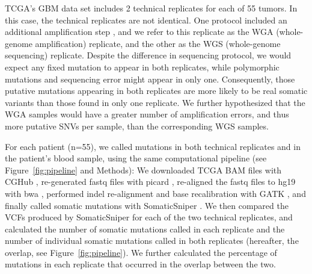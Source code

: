 \documentclass[11 pt]{article} %
\providecommand{\DIFadd}[1]{{\protect\color{blue}\uwave{#1}}} %
\providecommand{\DIFaddbegin}{} %
\providecommand{\DIFaddend}{} %
\begin{document}
TCGA's GBM data set includes 2 technical replicates for each of 55 tumors. In this case, the technical replicates are not identical. One protocol included an additional amplification step \citep{TCGA-GBM}, and we refer to this replicate as the WGA (whole-genome amplification) replicate, and the other as the WGS (whole-genome sequencing) replicate. Despite the difference in sequencing protocol, we would \DIFaddbegin \DIFadd{theoretically }\DIFaddend expect any fixed mutation to appear in both replicates, while polymorphic mutations and sequencing error might appear in only one. Consequently, those putative mutations appearing in both replicates are more likely to be real somatic variants than those found in only one replicate. We further hypothesized that the WGA samples would have a greater number of amplification errors, and thus more putative SNVs per sample, than the corresponding WGS samples. 

For each patient (n=55), we called mutations in both technical replicates and in the patient's blood sample, using the same computational pipeline (see Figure~\ref{fig:pipeline} and Methods): We downloaded TCGA BAM files with CGHub \citep{CGHub}, re-generated fastq files with picard \citep{picard}, re-aligned the fastq files to hg19 with bwa \citep{bwa}, performed indel re-alignment and base recalibration with GATK \citep{GATK}, and finally called somatic mutations with SomaticSniper \citep{SomaticSniper}. We then compared the VCFs produced by SomaticSniper for each of the two technical replicates, and calculated the number of somatic mutations called in each replicate and the number of individual somatic mutations called in both replicates (hereafter, the overlap, see Figure~\ref{fig:pipeline}). We further calculated the percentage of mutations in each replicate that occurred in the overlap between the two. 
\end{document}

